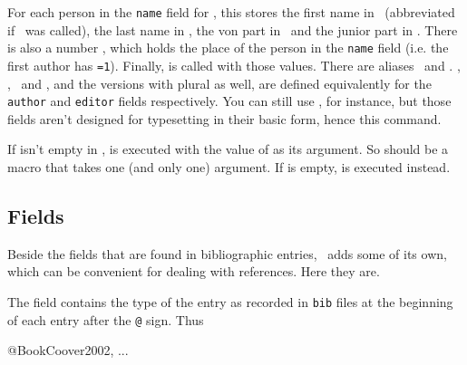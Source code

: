 For each person in the \texttt{name} field  for , this stores the first name
in \cmd\Firstname\ (abbreviated if \tcmd\AbbreviateFirstname\ was called),
the last name in \cmd\Lastname, the von part in
\cmd\Von\ and the junior part in \cmd\Junior. There is also a 
number \cmd\NameCount, which holds the place of the person in the
\texttt{name} field (i.e. the first author has \tcmd\NameCount\texttt{=1}).
Finally,  is called with those values. There are aliases
\cmd\ReadNames\ and \cmd\ReadNamesFor. \cmd\ReadAuthor, \cmd\ReadAuthorFor,
\cmd\ReadEditor\ and \cmd\ReadEditorFor, and the versions with plural as well,
are defined equivalently for the \texttt{author} and
\texttt{editor} fields respectively. You can still use , for instance, but those fields aren't designed
for typesetting in their basic form, hence this command.

If  isn't empty in ,  is
executed with the value of  as its argument. So
 should be a macro that takes one (and only one) argument.
If  is empty,  is executed instead.








\subsection{Fields}
Beside the fields that are found in bibliographic entries, \lib\ adds
some of its own, which can be convenient for dealing with references.
Here they are.

The  field contains the type of the entry as recorded
in \texttt{bib} files at the beginning of each entry after the
\texttt{@} sign. Thus

\verbatim
@Book{Coover2002,
  ...
}
\endverbatim

